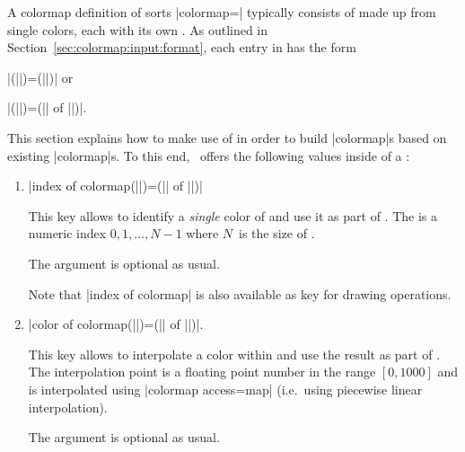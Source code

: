 A colormap definition of sorts |colormap=| typically consists of  made up from single colors, each with its own . As outlined in Section~\ref{sec:colormap:input:format}, each entry in  has the form 

	|(||)=(||)| or

	|(||)=(|| of ||)|.

\noindent This section explains how to make use of  in order to build |colormap|s based on existing |colormap|s. To this end, \PGFPlots\ offers the following values inside of a :

\begin{enumerate}
	\item
	|index of colormap(||)=(|| of ||)|

	This key allows to identify a \emph{single} color of  and use it as part of . The  is a numeric index $0,1,\dotsc,N-1$ where $N$~is the size of .


	The  argument is optional as usual.

	Note that |index of colormap| is also available as key for drawing operations.
	
	\item
	|color of colormap(||)=(|| of ||)|.

	This key allows to interpolate a color within  and use the result as part of . The interpolation point is a floating point number in the range $[0,1000]$ and is interpolated using |colormap access=map| (i.e.\ using piecewise linear interpolation).

	The  argument is optional as usual.


\end{enumerate}
